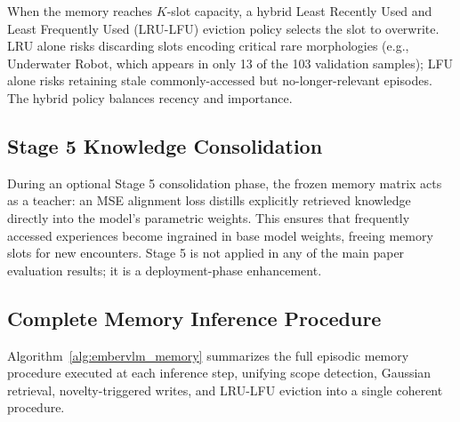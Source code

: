 When the memory reaches $K$-slot capacity, a hybrid Least Recently Used and Least Frequently Used (LRU-LFU) eviction policy selects the slot to overwrite. LRU alone risks discarding slots encoding critical rare morphologies (e.g., Underwater Robot, which appears in only 13 of the 103 validation samples); LFU alone risks retaining stale commonly-accessed but no-longer-relevant episodes. The hybrid policy balances recency and importance.

\subsection{Stage 5 Knowledge Consolidation}
During an optional Stage 5 consolidation phase, the frozen memory matrix acts as a teacher: an MSE alignment loss distills explicitly retrieved knowledge directly into the model's parametric weights. This ensures that frequently accessed experiences become ingrained in base model weights, freeing memory slots for new encounters. Stage 5 is not applied in any of the main paper evaluation results; it is a deployment-phase enhancement.

\subsection{Complete Memory Inference Procedure}

Algorithm~\ref{alg:embervlm_memory} summarizes the full episodic memory procedure executed at each inference step, unifying scope detection, Gaussian retrieval, novelty-triggered writes, and LRU-LFU eviction into a single coherent procedure.

